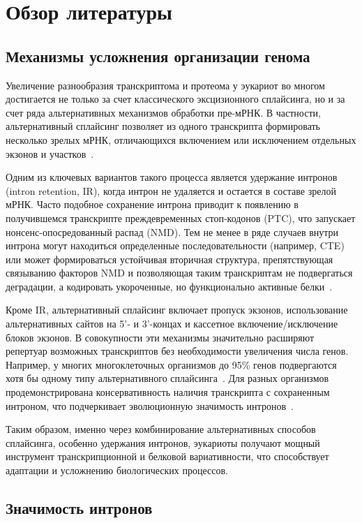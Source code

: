 \clearpage
\section{Обзор литературы}

\subsection{Механизмы усложнения организации генома}

Увеличение разнообразия транскриптома и протеома у эукариот во многом достигается не только за счет классического эксцизионного сплайсинга, но и за счет ряда альтернативных механизмов обработки пре-мРНК.
В частности, альтернативный сплайсинг позволяет из одного транскрипта формировать несколько зрелых мРНК, отличающихся включением или исключением отдельных экзонов и участков~\cite{Mamon2019,Juneau2006}.

Одним из ключевых вариантов такого процесса является удержание интронов (intron retention, IR), когда интрон не удаляется и остается в составе зрелой мРНК.
Часто подобное сохранение интрона приводит к появлению в получившемся транскрипте преждевременных стоп-кодонов (PTC), что запускает нонсенс-опосредованный распад (NMD).
Тем не менее в ряде случаев внутри интрона могут находиться определенные последовательности (например, CTE) или может формироваться устойчивая вторичная структура, препятствующая связыванию факторов NMD и позволяющая таким транскриптам не подвергаться деградации, а кодировать укороченные, но функционально активные белки~\cite{Mamon2013,Jo2015,Kalyna2012}.

Кроме IR, альтернативный сплайсинг включает пропуск экзонов, использование альтернативных сайтов на 5'- и 3'-концах и кассетное включение/исключение блоков экзонов.
В совокупности эти механизмы значительно расширяют репертуар возможных транскриптов без необходимости увеличения числа генов.
Например, у многих многоклеточных организмов до 95\% генов подвергаются хотя бы одному типу альтернативного сплайсинга~\cite{Mamon2019}.
Для разных организмов продемонстрирована консервативность наличия транскрипта с сохраненным интроном, что подчеркивает эволюционную значимость интронов~\cite{Mamon2013}.

Таким образом, именно через комбинирование альтернативных способов сплайсинга, особенно удержания интронов, эукариоты получают мощный инструмент транскрипционной и белковой вариативности, что способствует адаптации и усложнению биологических процессов.


\subsection{Значимость интронов}

